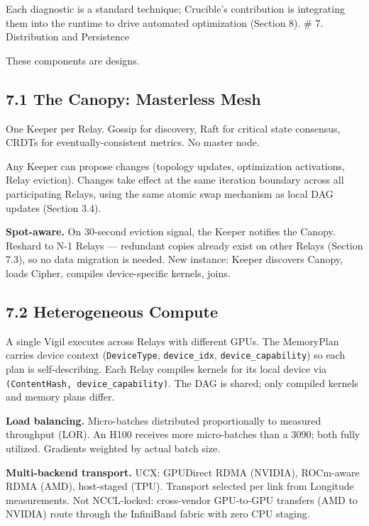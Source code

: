 Each diagnostic is a standard technique; Crucible's contribution is integrating them into the runtime to drive automated optimization (Section 8).
\# 7. Distribution and Persistence

These components are designs.

\subsection{7.1 The Canopy: Masterless Mesh}\label{the-canopy-masterless-mesh}

One Keeper per Relay. Gossip for discovery, Raft for critical state consensus, CRDTs for eventually-consistent metrics. No master node.

Any Keeper can propose changes (topology updates, optimization activations, Relay eviction). Changes take effect at the same iteration boundary across all participating Relays, using the same atomic swap mechanism as local DAG updates (Section 3.4).

\textbf{Spot-aware.} On 30-second eviction signal, the Keeper notifies the Canopy. Reshard to N-1 Relays --- redundant copies already exist on other Relays (Section 7.3), so no data migration is needed. New instance: Keeper discovers Canopy, loads Cipher, compiles device-specific kernels, joins.

\subsection{7.2 Heterogeneous Compute}\label{heterogeneous-compute}

A single Vigil executes across Relays with different GPUs. The MemoryPlan carries device context (\texttt{DeviceType}, \texttt{device\_idx}, \texttt{device\_capability}) so each plan is self-describing. Each Relay compiles kernels for its local device via \texttt{(ContentHash,\ device\_capability)}. The DAG is shared; only compiled kernels and memory plans differ.

\textbf{Load balancing.} Micro-batches distributed proportionally to measured throughput (LOR). An H100 receives more micro-batches than a 3090; both fully utilized. Gradients weighted by actual batch size.

\textbf{Multi-backend transport.} UCX: GPUDirect RDMA (NVIDIA), ROCm-aware RDMA (AMD), host-staged (TPU). Transport selected per link from Longitude measurements. Not NCCL-locked: cross-vendor GPU-to-GPU transfers (AMD to NVIDIA) route through the InfiniBand fabric with zero CPU staging.

